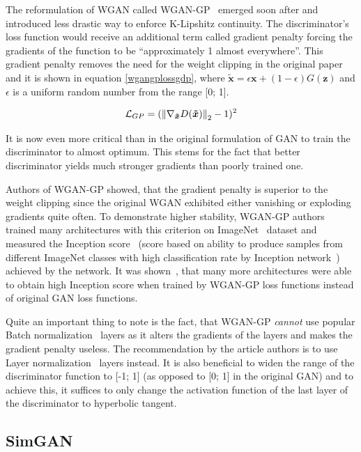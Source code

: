 The reformulation of WGAN called WGAN-GP~\cite{wgan-gp} emerged soon after and introduced less drastic way to enforce K-Lipshitz continuity. The discriminator's loss function would receive an additional term called gradient penalty forcing the gradients of the function to be ``approximately 1 almost everywhere''. This gradient penalty removes the need for the weight clipping in the original paper and it is shown in equation \ref{wgangplossgdp}, where $\bm{\tilde{x}} = \epsilon\bm{x} + (1 - \epsilon)G(\bm{z})$ and $\epsilon$ is a uniform random number from the range [0; 1].

\begin{equation}
\mathcal{L}_{GP} = (\left\lVert\nabla_{\bm{\tilde{x}}}D(\bm{\tilde{x}})\right\rVert_2 - 1)^2
\label{wgangplossgdp}
\end{equation}

It is now even more critical than in the original formulation of GAN to train the discriminator to almost optimum. This stems for the fact that better discriminator yields much stronger gradients than poorly trained one.

Authors of WGAN-GP showed, that the gradient penalty is superior to the weight clipping since the original WGAN exhibited either vanishing or exploding gradients quite often. To demonstrate higher stability, WGAN-GP authors trained many architectures with this criterion on ImageNet~\cite{imagenet} dataset and measured the Inception score~\cite{improvedgan} (score based on ability to produce samples from different ImageNet classes with high classification rate by Inception network~\cite{inception}) achieved by the network. It was shown~\cite{wgan-gp}, that many more architectures were able to obtain high Inception score when trained by WGAN-GP loss functions instead of original GAN loss functions.

Quite an important thing to note is the fact, that WGAN-GP {\em cannot} use popular Batch normalization~\cite{batchnorm} layers as it alters the gradients of the layers and makes the gradient penalty useless. The recommendation by the article authors is to use Layer normalization~\cite{layernorm} layers instead. It is also beneficial to widen the range of the discriminator function to [-1; 1] (as opposed to [0; 1] in the original GAN) and to achieve this, it suffices to only change the activation function of the last layer of the discriminator to hyperbolic tangent.

\subsection{SimGAN}


